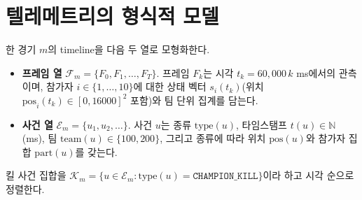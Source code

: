 
\section{텔레메트리의 형식적 모델}
\label{sec:problem-telemetry}

한 경기 $m$의 timeline을 다음 두 열로 모형화한다.

\begin{itemize}[leftmargin=1.5em]
  \item \textbf{프레임 열} $\mathcal{F}_m = \{F_0, F_1, \dots, F_{T}\}$. 프레임 $F_k$는 시각 $t_k = 60{,}000\,k$ ms에서의 관측이며, 참가자 $i \in \{1,\dots,10\}$에 대한 상태 벡터 $s_i(t_k)$(위치 $\mathrm{pos}_i(t_k) \in [0,16000]^2$ 포함)와 팀 단위 집계를 담는다.
  \item \textbf{사건 열} $\mathcal{E}_m = \{u_1, u_2, \dots\}$. 사건 $u$는 종류 $\mathrm{type}(u)$, 타임스탬프 $t(u) \in \mathbb{N}$ (ms), 팀 $\mathrm{team}(u) \in \{100, 200\}$, 그리고 종류에 따라 위치 $\mathrm{pos}(u)$와 참가자 집합 $\mathrm{part}(u)$를 갖는다.
\end{itemize}

킬 사건 집합을 $\mathcal{K}_m = \{u \in \mathcal{E}_m : \mathrm{type}(u) = \texttt{CHAMPION\_KILL}\}$이라 하고 시각 순으로 정렬한다.
